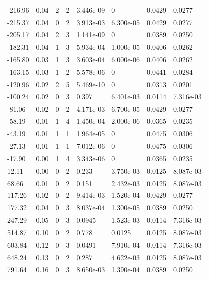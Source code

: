 \documentclass[preview]{standalone}
\begin{document}
{{\begin{tabular}{L{1.2cm}C{1.2cm} C{0.3cm}C{0.5cm} C{1.4cm}C{1.4cm} C{1.4cm}C{1.4cm}}
  -216.96  &  0.04  & 2     &  2 &  3.446e-09  & 0  & 0.0429 &  0.0277   \\ 
  -215.37  &  0.04  & 0     &  2 &  3.913e-03  & 6.300e-05  & 0.0429 &  0.0277   \\ 
  -205.17  &  0.04  & 2     &  3 &  1.141e-09  & 0  & 0.0389 &  0.0250   \\ 
  -182.31  &  0.04  & 1     &  3 &  5.934e-04  & 1.000e-05  & 0.0406 &  0.0262   \\ 
  -165.80  &  0.03  & 1     &  3 &  3.603e-04  & 6.000e-06  & 0.0406 &  0.0262   \\ 
  -163.15  &  0.03  & 1     &  2 &  5.578e-06  & 0  & 0.0441 &  0.0284   \\ 
  -120.96  &  0.02  & 2     &  5 &  5.469e-10  & 0  & 0.0313 &  0.0201   \\ 
  -100.24  &  0.02  & 0     &  3 &  0.397  & 6.401e-03  & 0.0114 &  7.316e-03   \\ 
  -81.06  &  0.02  & 0     &  2 &  4.171e-03  & 6.700e-05  & 0.0429 &  0.0277   \\ 
  -58.19  &  0.01  & 1     &  4 &  1.450e-04  & 2.000e-06  & 0.0365 &  0.0235   \\ 
  -43.19  &  0.01  & 1     &  1 &  1.964e-05  & 0  & 0.0475 &  0.0306   \\ 
  -27.13  &  0.01  & 1     &  1 &  7.012e-06  & 0  & 0.0475 &  0.0306   \\ 
  -17.90  &  0.00  & 1     &  4 &  3.343e-06  & 0  & 0.0365 &  0.0235   \\ 
  12.11  &  0.00  & 0     &  2 &  0.233  & 3.750e-03  & 0.0125 &  8.087e-03   \\ 
  68.66  &  0.01  & 0     &  2 &  0.151  & 2.432e-03  & 0.0125 &  8.087e-03   \\ 
  117.26  &  0.02  & 0     &  2 &  9.414e-03  & 1.520e-04  & 0.0429 &  0.0277   \\ 
  177.32  &  0.04  & 0     &  3 &  8.037e-04  & 1.300e-05  & 0.0389 &  0.0250   \\ 
  247.29  &  0.05  & 0     &  3 &  0.0945  & 1.523e-03  & 0.0114 &  7.316e-03   \\ 
  514.87  &  0.10  & 0     &  2 &  0.778  & 0.0125  & 0.0125 &  8.087e-03   \\ 
  603.84  &  0.12  & 0     &  3 &  0.0491  & 7.910e-04  & 0.0114 &  7.316e-03   \\ 
  648.24  &  0.13  & 0     &  2 &  0.287  & 4.622e-03  & 0.0125 &  8.087e-03   \\ 
  791.64  &  0.16  & 0     &  3 &  8.650e-03  & 1.390e-04  & 0.0389 &  0.0250   \\ 

\end{tabular}}}
\end{document}
